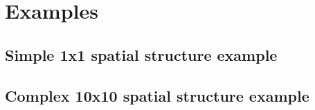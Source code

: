
\section{Examples\label{sec:examples}}


\subsection{Simple 1x1 spatial structure example}


\subsection{Complex 10x10 spatial structure example}

